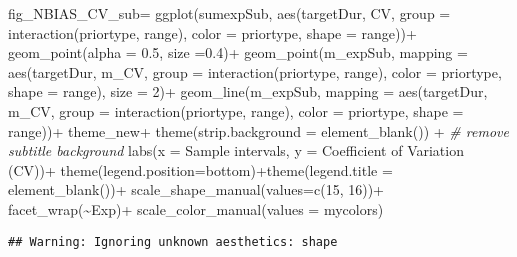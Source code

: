 \documentclass[
]{article}
\newenvironment{Shaded}{\begin{snugshade}}{\end{snugshade}}
\newcommand{\AttributeTok}[1]{\textcolor[rgb]{0.77,0.63,0.00}{#1}}
\newcommand{\CommentTok}[1]{\textcolor[rgb]{0.56,0.35,0.01}{\textit{#1}}}
\newcommand{\DecValTok}[1]{\textcolor[rgb]{0.00,0.00,0.81}{#1}}
\newcommand{\FloatTok}[1]{\textcolor[rgb]{0.00,0.00,0.81}{#1}}
\newcommand{\FunctionTok}[1]{\textcolor[rgb]{0.00,0.00,0.00}{#1}}
\newcommand{\NormalTok}[1]{#1}
\newcommand{\OtherTok}[1]{\textcolor[rgb]{0.56,0.35,0.01}{#1}}
\newcommand{\SpecialCharTok}[1]{\textcolor[rgb]{0.00,0.00,0.00}{#1}}
\newcommand{\StringTok}[1]{\textcolor[rgb]{0.31,0.60,0.02}{#1}}
\begin{document}
\begin{Shaded}
\begin{Highlighting}[]
\NormalTok{fig\_NBIAS\_CV\_sub}\OtherTok{=} \FunctionTok{ggplot}\NormalTok{(sumexpSub, }\FunctionTok{aes}\NormalTok{(targetDur, CV, }\AttributeTok{group =} \FunctionTok{interaction}\NormalTok{(priortype, range), }\AttributeTok{color =}\NormalTok{ priortype, }\AttributeTok{shape =}\NormalTok{ range))}\SpecialCharTok{+}
  \FunctionTok{geom\_point}\NormalTok{(}\AttributeTok{alpha =} \FloatTok{0.5}\NormalTok{, }\AttributeTok{size =}\FloatTok{0.4}\NormalTok{)}\SpecialCharTok{+}
  \FunctionTok{geom\_point}\NormalTok{(m\_expSub, }\AttributeTok{mapping =} \FunctionTok{aes}\NormalTok{(targetDur, m\_CV, }\AttributeTok{group =} \FunctionTok{interaction}\NormalTok{(priortype, range), }\AttributeTok{color =}\NormalTok{ priortype, }\AttributeTok{shape =}\NormalTok{ range), }\AttributeTok{size =} \DecValTok{2}\NormalTok{)}\SpecialCharTok{+}
  \FunctionTok{geom\_line}\NormalTok{(m\_expSub, }\AttributeTok{mapping =} \FunctionTok{aes}\NormalTok{(targetDur, m\_CV, }\AttributeTok{group =} \FunctionTok{interaction}\NormalTok{(priortype, range), }\AttributeTok{color =}\NormalTok{ priortype, }\AttributeTok{shape =}\NormalTok{ range))}\SpecialCharTok{+}
\NormalTok{  theme\_new}\SpecialCharTok{+} 
  \FunctionTok{theme}\NormalTok{(}\AttributeTok{strip.background =} \FunctionTok{element\_blank}\NormalTok{()) }\SpecialCharTok{+} \CommentTok{\# remove subtitle background}
  \FunctionTok{labs}\NormalTok{(}\AttributeTok{x =} \StringTok{\textquotesingle{}Sample intervals\textquotesingle{}}\NormalTok{, }\AttributeTok{y =} \StringTok{\textquotesingle{}Coefficient of Variation (CV)\textquotesingle{}}\NormalTok{)}\SpecialCharTok{+}
  \FunctionTok{theme}\NormalTok{(}\AttributeTok{legend.position=}\StringTok{\textquotesingle{}bottom\textquotesingle{}}\NormalTok{)}\SpecialCharTok{+}\FunctionTok{theme}\NormalTok{(}\AttributeTok{legend.title =} \FunctionTok{element\_blank}\NormalTok{())}\SpecialCharTok{+}
  \FunctionTok{scale\_shape\_manual}\NormalTok{(}\AttributeTok{values=}\FunctionTok{c}\NormalTok{(}\DecValTok{15}\NormalTok{, }\DecValTok{16}\NormalTok{))}\SpecialCharTok{+}
  \FunctionTok{facet\_wrap}\NormalTok{(}\SpecialCharTok{\textasciitilde{}}\NormalTok{Exp)}\SpecialCharTok{+}
  \FunctionTok{scale\_color\_manual}\NormalTok{(}\AttributeTok{values =}\NormalTok{ mycolors) }
\end{Highlighting}
\end{Shaded}

\begin{verbatim}
## Warning: Ignoring unknown aesthetics: shape
\end{verbatim}
\end{document}

